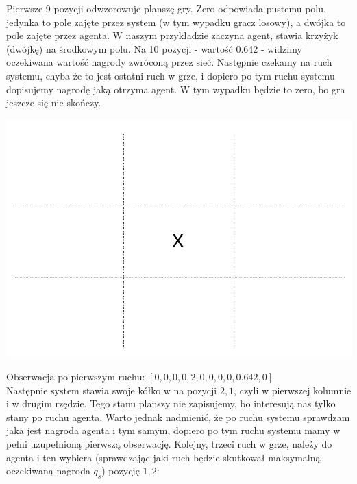 \documentclass[licencjacka]{pracamgr}
\begin{document}
Pierwsze 9 pozycji odwzorowuje planszę gry. Zero odpowiada pustemu polu, jedynka to pole zajęte przez system (w tym wypadku gracz losowy), a dwójka to pole zajęte przez agenta.
W naszym przykładzie zaczyna agent, stawia krzyżyk (dwójkę) na środkowym polu. Na 10 pozycji  - wartość 0.642  - widzimy oczekiwana wartość nagrody zwróconą przez sieć. Następnie czekamy na ruch systemu, chyba że to jest ostatni ruch w grze, i dopiero po tym ruchu systemu dopisujemy nagrodę jaką otrzyma agent. W tym wypadku będzie to zero, bo gra jeszcze się nie skończy.

 
\begin{flushleft}
	\includegraphics [scale=0.2] {ttt_6.png}
\end{flushleft}
$\text{Obserwacja po pierwszym ruchu:  }[0, 0, 0, 0, 2, 0, 0, 0, 0, 0.642, 0]$\\

 Następnie system stawia swoje kółko w na pozycji $2,1$, czyli w pierwszej kolumnie i w drugim rzędzie. Tego stanu planszy nie zapisujemy, bo interesują nas tylko stany po ruchu agenta. Warto jednak nadmienić, że po ruchu systemu sprawdzam jaka jest nagroda agenta i tym samym, dopiero po tym ruchu systemu mamy w pełni uzupełnioną pierwszą obserwację. Kolejny, trzeci ruch w grze, należy do agenta i ten wybiera (sprawdzając jaki ruch będzie skutkował maksymalną oczekiwaną nagroda $q_{s}$) pozycję $1,2$:
 
\end{document}
